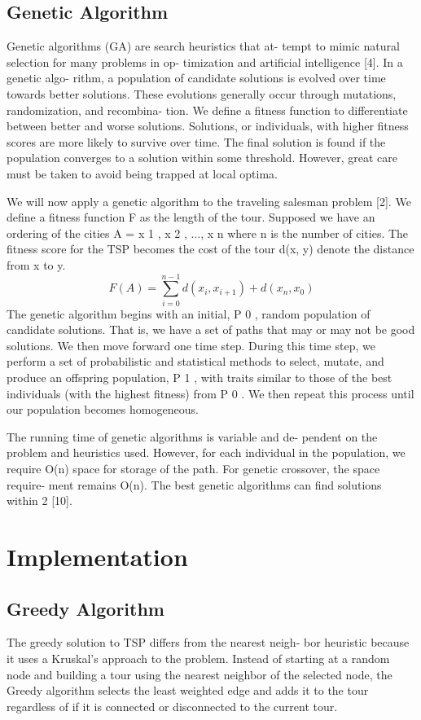 \documentclass[10pt,twocolumn,letterpaper]{article}
\begin{document}
\subsection{Genetic Algorithm}
Genetic algorithms (GA) are search heuristics that at-
tempt to mimic natural selection for many problems in op-
timization and artificial intelligence [4]. In a genetic algo-
rithm, a population of candidate solutions is evolved over
time towards better solutions. These evolutions generally
occur through mutations, randomization, and recombina-
tion. We define a fitness function to differentiate between
better and worse solutions. Solutions, or individuals, with
higher fitness scores are more likely to survive over time.
The final solution is found if the population converges to a
solution within some threshold. However, great care must
be taken to avoid being trapped at local optima.

We will now apply a genetic algorithm to the traveling
salesman problem [2]. We define a fitness function F as the
length of the tour. Supposed we have an ordering of the
cities A = {x 1 , x 2 , ..., x n } where n is the number of cities.
The fitness score for the TSP becomes the cost of the tour
d(x, y) denote the distance from x to y.
\begin{equation}
	F(A) =\sum_{i=0}^{n-1} d(x_i , x_{i+1}) + d(x_n , x_0 )
\end{equation}
The genetic algorithm begins with an initial, P 0 , random
population of candidate solutions. That is, we have a set of
paths that may or may not be good solutions. We then move
forward one time step. During this time step, we perform a
set of probabilistic and statistical methods to select, mutate,
and produce an offspring population, P 1 , with traits similar
to those of the best individuals (with the highest fitness)
from P 0 . We then repeat this process until our population
becomes homogeneous.

The running time of genetic algorithms is variable and de-
pendent on the problem and heuristics used. However, for
each individual in the population, we require O(n) space for
storage of the path. For genetic crossover, the space require-
ment remains O(n). The best genetic algorithms can find
solutions within 2%
[10].

\section{Implementation}
\subsection{Greedy Algorithm}
The greedy solution to TSP differs from the nearest neigh-
bor heuristic because it uses a Kruskal’s approach to the
problem. Instead of starting at a random node and building
a tour using the nearest neighbor of the selected node, the
Greedy algorithm selects the least weighted edge and adds
it to the tour regardless of if it is connected or disconnected
to the current tour.
\end{document}
